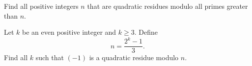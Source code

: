 \documentclass{subfile}
\begin{document}
	\begin{problem}
		Find all positive integers $n$ that are quadratic residues modulo all primes greater than $n$.
	\end{problem}


	\begin{problem}
		Let $k$ be an even positive integer and $k\ge 3$. Define $$n=\frac{2^k-1}{3}.$$ Find all $k$ such that $(-1)$ is a quadratic residue modulo $n$.
	\end{problem}

\end{document}
